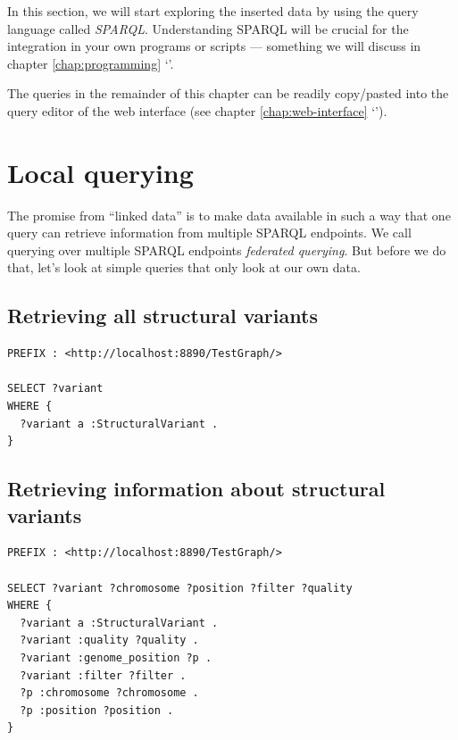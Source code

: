 \documentclass[11pt,a4paper,oneside]{book}
\begin{document}
  In this section, we will start exploring the inserted data by using the
  query language called \emph{SPARQL}.  Understanding SPARQL will be crucial
  for the integration in your own programs or scripts --- something we will
  discuss in chapter \ref{chap:programming}
  {\color{LinkGray}`'}.

  The queries in the remainder of this chapter can be readily copy/pasted into
  the query editor of the web interface (see chapter \ref{chap:web-interface}
  {\color{LinkGray}`'}).

\section{Local querying}

  The promise from ``linked data'' is to make data available in such a way that
  one query can retrieve information from multiple SPARQL endpoints.  We call
  querying over multiple SPARQL endpoints \emph{federated querying}.  But before
  we do that, let's look at simple queries that only look at our own data.

\subsection{Retrieving all structural variants}
\begin{siderules}
\begin{verbatim}
PREFIX : <http://localhost:8890/TestGraph/>

SELECT ?variant
WHERE {
  ?variant a :StructuralVariant .
}
\end{verbatim} 
\end{siderules}

\subsection{Retrieving information about structural variants}
\label{sec:sparqling-svs}

\begin{siderules}
\begin{verbatim}
PREFIX : <http://localhost:8890/TestGraph/>

SELECT ?variant ?chromosome ?position ?filter ?quality
WHERE {
  ?variant a :StructuralVariant .
  ?variant :quality ?quality .
  ?variant :genome_position ?p .
  ?variant :filter ?filter .
  ?p :chromosome ?chromosome .
  ?p :position ?position .
}
\end{verbatim}
\end{siderules}
\end{document}
